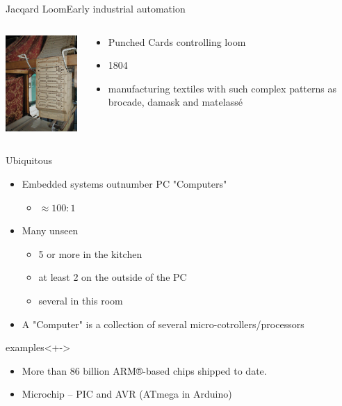 \documentclass[xcolor=svgnames]{beamer}
\begin{document}
\begin{frame}{Jacqard Loom}{Early industrial automation}
\begin{columns}[onlytextwidth]
\begin{column}{.6\textwidth}
    \includegraphics{Jacquard-loom-cards.png}
\end{column}
\begin{column}{.4\textwidth}
    \begin{itemize}
        \item Punched Cards controlling loom
        \item 1804
        \item manufacturing textiles with such complex patterns as brocade, damask and matelassé
    \end{itemize}
\end{column}
\end{columns}
\end{frame}

\begin{frame}{Ubiquitous }
    \begin{itemize}[<+->]
        \item Embedded systems outnumber PC "Computers"
        \begin{itemize}
            \item $\approx 100 : 1$
        \end{itemize}
        \item Many unseen
        \begin{itemize}
            \item 5 or more in the kitchen
            \item at least 2 on the outside of the PC
            \item several in this room
        \end{itemize}
        \item A "Computer" is a collection of several micro-cotrollers/processors
    \end{itemize}

    \begin{block}{examples}<+->
      \begin{itemize}
        \item More than 86 billion ARM®-based chips shipped to date.
        \item Microchip -- PIC and AVR (ATmega in Arduino)
      \end{itemize}
    \end{block}
\end{frame}
\end{document}

